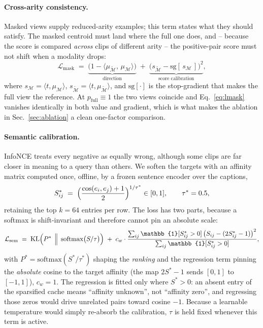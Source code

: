 \paragraph{Cross-arity consistency.}
Masked views supply reduced-arity examples; this term states what they should satisfy.
The masked centroid must land where the full one does, and -- because the score is
compared \emph{across} clips of different arity -- the positive-pair score must not
shift when a modality drops:
\begin{equation}
  \mathcal{L}_{\mathrm{mask}} \;=\;
  \underbrace{\bigl(1 - \langle \mu_{\tilde{\mathcal{M}}},\, \mu_{\mathcal{M}} \rangle\bigr)}
             _{\text{direction}}
  \;+\;
  \underbrace{\bigl(s_{\tilde{\mathcal{M}}} - \mathrm{sg}[\,s_{\mathcal{M}}\,]\bigr)^2}
             _{\text{score calibration}},
  \label{eq:lmask}
\end{equation}
where $s_{\mathcal{M}} = \langle t, \mu_{\mathcal{M}} \rangle$,
$s_{\tilde{\mathcal{M}}} = \langle t, \mu_{\tilde{\mathcal{M}}} \rangle$, and
$\mathrm{sg}[\cdot]$ is the stop-gradient that makes the full view the reference. At
$p_{\mathrm{full}} \equiv 1$ the two views coincide and
Eq.~\eqref{eq:lmask} vanishes identically in both value and gradient, which is what
makes the ablation in Sec.~\ref{sec:ablation} a clean one-factor comparison.

\paragraph{Semantic calibration.}
InfoNCE treats every negative as equally wrong, although some clips are far closer in
meaning to a query than others. We soften the targets with an affinity matrix
computed once, offline, by a frozen sentence encoder over the captions,
\begin{equation}
  S^*_{ij} \;=\; \Bigl(\frac{\cos(e_i, e_j) + 1}{2}\Bigr)^{1/\tau^*} \in [0,1],
  \qquad \tau^* = 0.5,
  \label{eq:sstar}
\end{equation}
retaining the top $k = 64$ entries per row. The loss has two parts, because a softmax
is shift-invariant and therefore cannot pin an absolute scale:
\begin{equation}
  \mathcal{L}_{\mathrm{sem}} \;=\;
  \mathrm{KL}\Bigl(P^* \,\Bigm\|\, \mathrm{softmax}\bigl(S/\tau\bigr)\Bigr)
  \;+\; c_w \cdot
  \frac{\sum_{ij} \mathbb{1}[S^*_{ij} > 0]\,\bigl(S_{ij} - (2 S^*_{ij} - 1)\bigr)^2}
       {\sum_{ij} \mathbb{1}[S^*_{ij} > 0]},
  \label{eq:lsem}
\end{equation}
with $P^* = \mathrm{softmax}(S^*/\tau^*)$ shaping the \emph{ranking} and the
regression term pinning the \emph{absolute} cosine to the target affinity (the map
$2S^* - 1$ sends $[0,1]$ to $[-1,1]$), $c_w = 1$. The regression is fitted only where
$S^* > 0$: an absent entry of the sparsified cache means ``affinity unknown'', not
``affinity zero'', and regressing those zeros would drive unrelated pairs toward
cosine $-1$. Because a learnable temperature would simply re-absorb the calibration,
$\tau$ is held fixed whenever this term is active.

